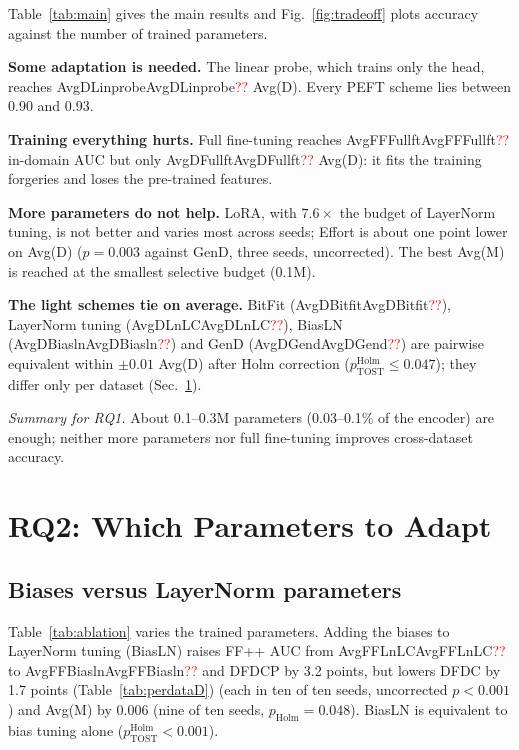 \documentclass[fonts]{icst}
\newcommand{\num}[1]{\ifcsname #1\endcsname\csname #1\endcsname\else\textcolor{red}{??}\fi}
\begin{document}
\begin{table}[!t]
\centering
\caption{Ablation of selective and low-rank schemes and of $L_2$ normalization before the classifier (same protocol). Bold: best; shaded: second best.}
\label{tab:ablation}
\resizebox{0.85\textwidth}{!}{}
\end{table}


Table~\ref{tab:main} gives the main results and Fig.~\ref{fig:tradeoff} plots accuracy against the number of trained parameters.

\textbf{Some adaptation is needed.} The linear probe, which trains only the head, reaches \num{AvgDLinprobe} Avg(D). Every PEFT scheme lies between 0.90 and 0.93.

\textbf{Training everything hurts.} Full fine-tuning reaches \num{AvgFFFullft} in-domain AUC but only \num{AvgDFullft} Avg(D): it fits the training forgeries and loses the pre-trained features.


\textbf{More parameters do not help.} LoRA, with $7.6\times$ the budget of LayerNorm tuning, is not better and varies most across seeds; Effort is about one point lower on Avg(D) ($p=0.003$ against GenD, three seeds, uncorrected). The best Avg(M) is reached at the smallest selective budget (0.1M).

\textbf{The light schemes tie on average.} BitFit (\num{AvgDBitfit}), LayerNorm tuning (\num{AvgDLnLC}), BiasLN (\num{AvgDBiasln}) and GenD (\num{AvgDGend}) are pairwise equivalent within $\pm0.01$ Avg(D) after Holm correction ($p^{\mathrm{Holm}}_{\mathrm{TOST}}\le0.047$); they differ only per dataset (Sec.~\ref{sec:ablation}).




\textit{Summary for RQ1.} About 0.1--0.3M parameters (0.03--0.1\% of the encoder) are enough; neither more parameters nor full fine-tuning improves cross-dataset accuracy.

\section{RQ2: Which Parameters to Adapt}
\label{sec:ablation}



\subsection{Biases versus LayerNorm parameters}
Table~\ref{tab:ablation} varies the trained parameters. Adding the biases to LayerNorm tuning (BiasLN) raises FF++ AUC from \num{AvgFFLnLC} to \num{AvgFFBiasln} and DFDCP by 3.2 points, but lowers DFDC by 1.7 points (Table~\ref{tab:perdataD}) (each in ten of ten seeds, uncorrected $p<0.001$) and Avg(M) by 0.006 (nine of ten seeds, $p_{\mathrm{Holm}}=0.048$). BiasLN is equivalent to bias tuning alone ($p^{\mathrm{Holm}}_{\mathrm{TOST}}<0.001$).
\end{document}
